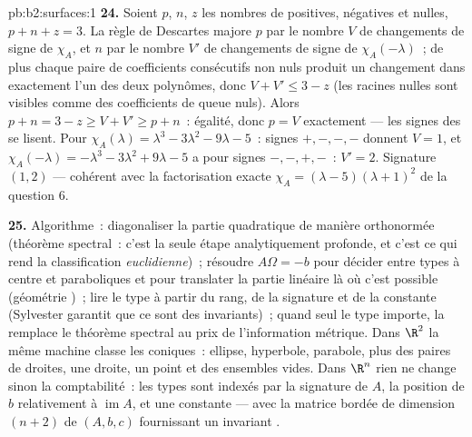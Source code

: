 \begin{solution}{pb:b2:surfaces:1}
\textbf{24.} Soient $p$, $n$, $z$ les nombres de  positives,
négatives et nulles, $p + n + z = 3$. La règle de Descartes
majore $p$ par le nombre $V$ de changements de signe de
$\chi_A$, et $n$ par le nombre $V'$ de changements de signe de
$\chi_A(-\lambda)$~; de plus chaque paire de coefficients consécutifs
non nuls produit un changement dans exactement l'un des deux
polynômes, donc $V + V' \leq 3 - z$ (les racines nulles sont visibles
comme des coefficients de queue nuls). Alors $p + n = 3 - z \geq
V + V' \geq p + n$~: égalité, donc $p = V$ exactement --- les
signes des  se lisent. Pour $\chi_A(\lambda)
= \lambda^3 - 3\lambda^2 - 9\lambda - 5$~: signes $+,-,-,-$
donnent $V = 1$, et $\chi_A(-\lambda) = -\lambda^3 - 3\lambda^2
+ 9\lambda - 5$ a pour signes $-,-,+,-$~: $V' = 2$. Signature $(1,
2)$ --- cohérent avec la factorisation exacte $\chi_A =
(\lambda - 5)(\lambda + 1)^2$ de la question 6.

\textbf{25.} Algorithme~: diagonaliser la partie quadratique
de manière orthonormée (théorème spectral~: c'est la seule
étape analytiquement profonde, et c'est ce qui rend la
classification \emph{euclidienne})~; résoudre $A\Omega = -b$ pour
décider entre types à centre et paraboliques et pour translater
la partie linéaire là où c'est possible (géométrie )~; lire le
type à partir du rang, de la signature et de la constante (Sylvester
garantit que ce sont des invariants)~; quand seul le type 
importe, la  remplace le théorème spectral au
prix de l'information métrique. Dans $\R^2$ la même
machine classe les coniques~: ellipse, hyperbole, parabole, plus
des paires de droites, une droite, un point et des ensembles vides. Dans $\R^n$
rien ne change sinon la comptabilité~: les types sont indexés par la
signature de $A$, la position de $b$ relativement à
$\operatorname{im}A$, et une constante --- avec la
matrice bordée de dimension $(n{+}2)$ de $(A, b, c)$
fournissant un invariant .
\end{solution}
